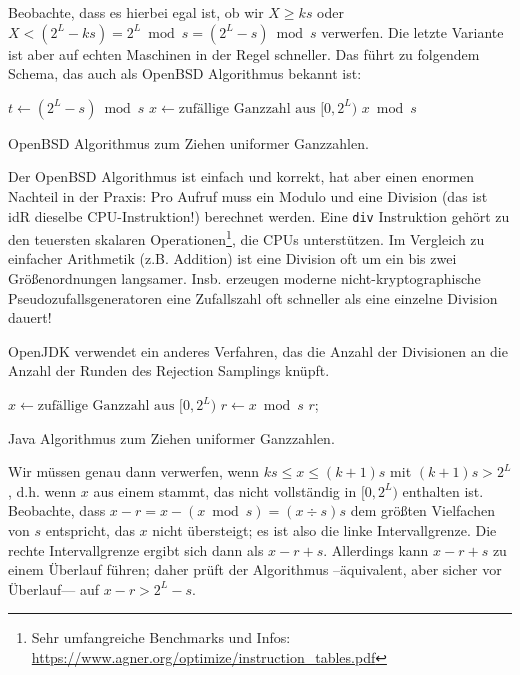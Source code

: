 Beobachte, dass es hierbei egal ist, ob wir $X \ge ks$ oder $X < (2^L - ks) = 2^L \bmod s = (2^L -s) \bmod s$ verwerfen.
Die letzte Variante ist aber auf echten Maschinen in der Regel schneller.
Das führt zu folgendem Schema, das auch als OpenBSD Algorithmus bekannt ist:

\begin{algorithm}[H]
    $t \gets (2^L - s) \bmod s$
    $x \gets \text{zufällige Ganzzahl aus $[0, 2^L)$}$\;
    \While{x < t}{
    $x \gets \text{zufällige Ganzzahl aus $[0, 2^L)$}$\;
    }
    \Return $x \bmod s$\;
    \caption{OpenBSD Algorithmus zum Ziehen uniformer Ganzzahlen.}
\end{algorithm}

Der OpenBSD Algorithmus ist einfach und korrekt, hat aber einen enormen Nachteil in der Praxis:
Pro Aufruf muss ein Modulo und eine Division (das ist idR dieselbe CPU-Instruktion!) berechnet werden.
Eine \texttt{div} Instruktion gehört zu den teuersten skalaren Operationen\footnote{Sehr umfangreiche Benchmarks und Infos: \url{https://www.agner.org/optimize/instruction_tables.pdf}}, die CPUs unterstützen.
Im Vergleich zu einfacher Arithmetik (z.B. Addition) ist eine Division oft um ein bis zwei Größenordnungen langsamer.
Insb. erzeugen moderne nicht-kryptographische Pseudozufallsgeneratoren eine Zufallszahl oft schneller als eine einzelne Division dauert!

OpenJDK verwendet ein anderes Verfahren, das die Anzahl der Divisionen an die Anzahl der Runden des Rejection Samplings knüpft.

\begin{algorithm}[H]
    $x \gets \text{zufällige Ganzzahl aus $[0, 2^L)$}$\;
    $r \gets x \bmod s$\;
    \While{$x - r > 2^L - s$}{
    $x \gets \text{zufällige Ganzzahl aus $[0, 2^L)$}$\;
    $r \gets x \bmod s$\;
    }
    \Return $r$;
    \caption{Java Algorithmus zum Ziehen uniformer Ganzzahlen.}
\end{algorithm}

Wir müssen genau dann verwerfen, wenn $ks \le x \le (k+1)s$ mit $(k+1)s > 2^L$, d.h. wenn $x$ aus einem  stammt, das nicht vollständig in $[0, 2^L)$ enthalten ist.
Beobachte, dass $x - r = x - (x \bmod s) = (x \div s)s$ dem größten Vielfachen von $s$ entspricht, das $x$ nicht übersteigt;
es ist also die linke Intervallgrenze.
Die rechte Intervallgrenze ergibt sich dann als $x- r +s$.
Allerdings kann $x - r + s$ zu einem Überlauf führen; daher prüft der Algorithmus --äquivalent, aber sicher vor Überlauf--- auf $x - r > 2^L - s$.

